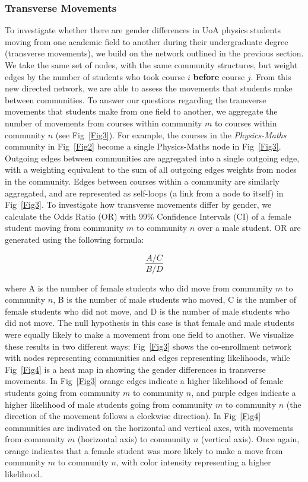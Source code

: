 \subsubsection*{Transverse Movements}
To investigate whether there are gender differences in UoA physics students moving from one academic field to another during their undergraduate degree (transverse movements), we build on the network outlined in the previous section. We take the same set of nodes, with the same community structures, but weight edges by the number of students who took course $i$ \textbf{before} course $j$. From this new directed network, we are able to assess the movements that students make between communities. To answer our questions regarding the transverse movements that students make from one field to another, we aggregate the number of movements from courses within community $m$ to courses within community $n$ (see Fig~\ref{Fig3}). For example, the courses in the \textit{Physics-Maths} community in Fig~\ref{Fig2} become a single Physics-Maths node in Fig~\ref{Fig3}. Outgoing edges between communities are aggregated into a single outgoing edge, with a weighting equivalent to the sum of all outgoing edges weights from nodes in the community. Edges between courses within a community are similarly aggregated, and are represented as self-loops (a link from a node to itself) in Fig~\ref{Fig3}. To investigate how transverse movements differ by gender, we calculate the Odds Ratio (OR) with 99\% Confidence Intervals (CI) of a female student moving from community $m$ to community $n$ over a male student. OR are generated using the following formula\cite{field2012discovering}: 

    $$\frac{A/C}{B/D}$$

where A is the number of female students who did move from community $m$ to community $n$, B is the number of male students who moved, C is the number of female students who did not move, and D is the number of male students who did not move. The null hypothesis in this case is that female and male students were equally likely to make a movement from one field to another. We visualize these results in two different ways: Fig~\ref{Fig3} shows the co-enrollment network with nodes representing communities and edges representing likelihoods, while Fig~\ref{Fig4} is a heat map in showing the gender differences in transverse movements. In Fig~\ref{Fig3} orange edges indicate a higher likelihood of female students going from community $m$ to community $n$, and purple edges indicate a higher likelihood of male students going from community $m$ to community $n$ (the direction of the movement follows a clockwise direction).  In Fig~\ref{Fig4} communities are indivated on the horizontal and vertical axes, with movements from community $m$ (horizontal axis) to community $n$ (vertical axis). Once again, orange indicates that a female student was more likely to make a move from community $m$ to community $n$, with color intensity representing a higher likelihood. 

